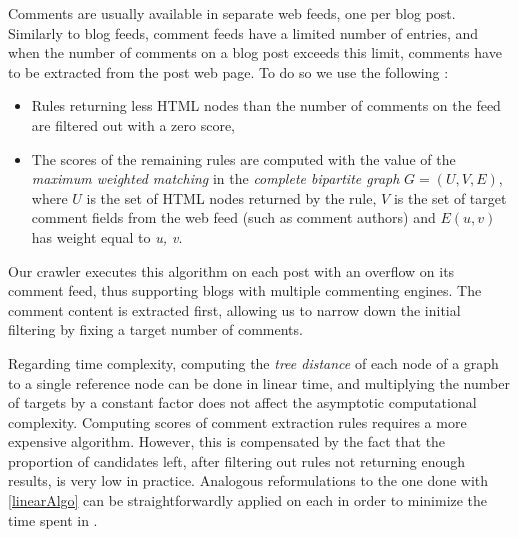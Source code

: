 Comments are usually available in separate web feeds, one per blog post. Similarly to blog feeds, comment feeds have a limited number of entries, and when the number of comments on a blog post exceeds this limit, comments have to be extracted from the post web page. To do so we use the following :

\begin{itemize}
  \item Rules returning less HTML nodes than the number of comments on the feed are filtered out with a zero score,
  \item The scores of the remaining rules are computed with the value of the \emph{maximum weighted matching} in the \emph{complete bipartite graph} $G = (U, V, E)$, where $U$ is the set of HTML nodes returned by the rule, $V$ is the set of target comment fields from the web feed (such as comment authors) and $E(u, v)$ has weight equal to \code{(}\emph{u, v}\code{)}.
\end{itemize}
Our crawler executes this algorithm on each post with an overflow on its comment feed, thus supporting blogs with multiple commenting engines. The comment content is extracted first, allowing us to narrow down the initial filtering by fixing a target number of comments.

Regarding time complexity, computing the \emph{tree distance} of each node of a graph to a single reference node can be done in linear time, and multiplying the number of targets by a constant factor does not affect the asymptotic computational complexity. Computing scores of comment extraction rules requires a more expensive algorithm. However, this is compensated by the fact that the proportion of candidates left, after filtering out rules not returning enough results, is very low in practice. Analogous reformulations to the one done with \autoref{linearAlgo} can be straightforwardly applied on each  in order to minimize the time spent in .

